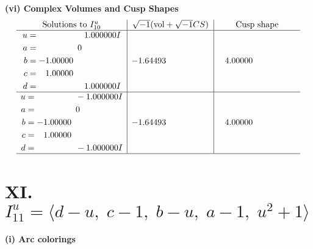 \documentclass[1p]{elsarticle_modified}
\theoremstyle{definition}
\newcommand{\I}{\sqrt{-1}}
\begin{document}
\newpage\flushleft \textbf{(vi) Complex Volumes and Cusp Shapes}
$$\begin{array}{c|c|c}  
\text{Solutions to }I^u_{10}& \I (\text{vol} + \sqrt{-1}CS) & \text{Cusp shape}\\
 \hline 
\begin{aligned}
u &= \phantom{-0.000000 -}1.000000 I \\
a &= \phantom{-0.000000 } 0 \\
b &= -1.00000\phantom{ +0.000000I} \\
c &= \phantom{-}1.00000\phantom{ +0.000000I} \\
d &= \phantom{-0.000000 -}1.000000 I\end{aligned}
 & -1.64493\phantom{ +0.000000I} & \phantom{-}4.00000\phantom{ +0.000000I} \\ \hline\begin{aligned}
u &= \phantom{-0.000000 } -1.000000 I \\
a &= \phantom{-0.000000 } 0 \\
b &= -1.00000\phantom{ +0.000000I} \\
c &= \phantom{-}1.00000\phantom{ +0.000000I} \\
d &= \phantom{-0.000000 } -1.000000 I\end{aligned}
 & -1.64493\phantom{ +0.000000I} & \phantom{-}4.00000\phantom{ +0.000000I}\\
 \hline 
 \end{array}$$\newpage\newpage\renewcommand{\arraystretch}{1}
\centering \section*{XI. $I^u_{11}= \langle d- u,\;c-1,\;b- u,\;a-1,\;u^2+1 \rangle$}
\flushleft \textbf{(i) Arc colorings}\\
\end{document}
